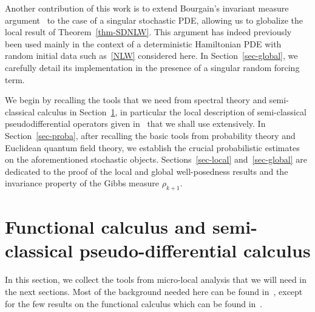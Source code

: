 \documentclass[AHL,Unicode,longabstracts,published]{cedram}
\begin{document}
Another contribution of this work is to extend Bourgain's invariant measure argument~\cite{BO94,BO96} to the case of a singular stochastic PDE, allowing us to globalize the local result of Theorem~\ref{thm-SDNLW}. This argument has indeed previously been used mainly in the context of a deterministic Hamiltonian PDE with random initial data such as~\eqref{NLW} considered here. In Section~\ref{sec-global}, we carefully detail its implementation in the presence of a singular random forcing term.

We begin by recalling the tools that we need from spectral theory and semi-classical calculus in Section~\ref{SEC:PDO}, in particular the local description of semi-classical pseudodifferential operators given in~\cite{BGT} that we shall use extensively. In Section~\ref{sec-proba}, after recalling the basic tools from probability theory and Euclidean quantum field theory, we establish the crucial probabilistic estimates on the aforementioned stochastic objects. Sections~\ref{sec-local} and~\ref{sec-global} are dedicated to the proof of the local and global well-posedness results and the invariance property of the Gibbs measure $\rho_{k+1}$.

\section{Functional calculus and semi-classical pseudo-differential calculus}\label{SEC:PDO}

In this section, we collect the tools from micro-local analysis that we will need in the next sections. Most of the background needed here can be found in~\cite{Zworski}, except for the few results on the functional calculus which can be found in~\cite{Davies}.
\end{document}
